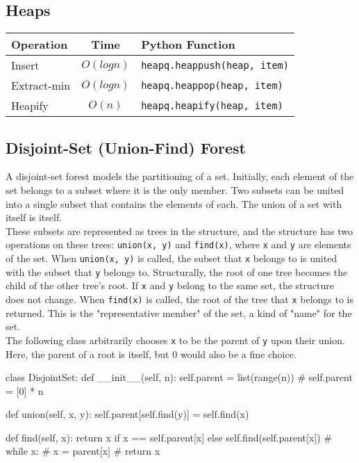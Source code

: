 \documentclass[12pt]{article}
\begin{document}
\subsection{Heaps}
\begin{center}
\begin{tabular}{|l|c|l|}
  \hline
  \textbf{Operation} & \textbf{Time} & \textbf{Python Function} \\
  \hline
  Insert & $O(logn)$ & \texttt{heapq.heappush(heap, item)} \\
  Extract-min & $O(logn)$ & \texttt{heapq.heappop(heap, item)} \\
  Heapify & $O(n)$ & \texttt{heapq.heapify(heap, item)} \\
  \hline
\end{tabular}
\end{center}

\subsection{Disjoint-Set (Union-Find) Forest}
A disjoint-set forest models the partitioning of a set. Initially, each element of the set belongs to a subset where it is the only member. Two subsets can be united into a single subset that contains the elements of each. The union of a set with itself is itself. \\

These subsets are represented as trees in the structure, and the structure has two operations on these trees: \texttt{union(x, y)} and \texttt{find(x)}, where \texttt{x} and \texttt{y} are elements of the set. When \texttt{union(x, y)} is called, the subset that \texttt{x} belongs to is united with the subset that \texttt{y} belongs to. Structurally, the root of one tree becomes the child of the other tree's root. If \texttt{x} and \texttt{y} belong to the same set, the structure does not change. When \texttt{find(x)} is called, the root of the tree that \texttt{x} belongs to is returned. This is the "representative member" of the set, a kind of "name" for the set. \\

The following class arbitrarily chooses \texttt{x} to be the parent of \texttt{y} upon their union. Here, the parent of a root is itself, but $0$ would also be a fine choice.
\medskip
\begin{python}
class DisjointSet:
    def __init__(self, n):
        self.parent = list(range(n))
        # self.parent = [0] * n

    def union(self, x, y):
        self.parent[self.find(y)] = self.find(x)

    def find(self, x):
        return x if x == self.parent[x] else self.find(self.parent[x])
        # while x:
        #     x = parent[x]
        # return x
\end{python}
\bigskip
\end{document}
